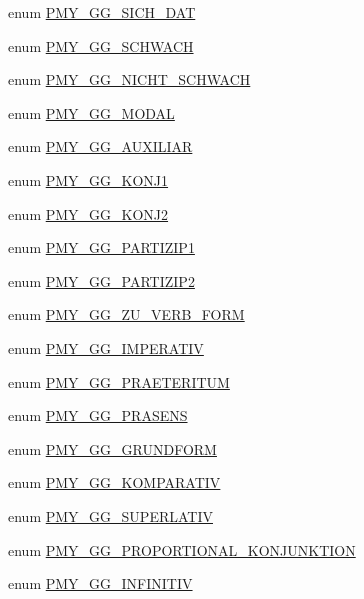 \begin{DoxyCompactItemize}
\item 
enum \hyperlink{gramtab__consts_8php_a30cdcbc198473b63f16f4323928faf96}{PMY\_\-GG\_\-SICH\_\-DAT} 
\item 
enum \hyperlink{gramtab__consts_8php_af23f5a5d0c48da18c4fb7e03a02140ce}{PMY\_\-GG\_\-SCHWACH} 
\item 
enum \hyperlink{gramtab__consts_8php_a934d13cf02654ea66217db78aed651e4}{PMY\_\-GG\_\-NICHT\_\-SCHWACH} 
\item 
enum \hyperlink{gramtab__consts_8php_a4b34a0d19c532c52418137101f6ad347}{PMY\_\-GG\_\-MODAL} 
\item 
enum \hyperlink{gramtab__consts_8php_a1c9092d56a2b707d90e3ac80413e4cad}{PMY\_\-GG\_\-AUXILIAR} 
\item 
enum \hyperlink{gramtab__consts_8php_a28c8cac68840c13079ff84e2d68b3e67}{PMY\_\-GG\_\-KONJ1} 
\item 
enum \hyperlink{gramtab__consts_8php_afeef8954bf0cf2ffa383a2912a8794d9}{PMY\_\-GG\_\-KONJ2} 
\item 
enum \hyperlink{gramtab__consts_8php_a37462ac47895160347be026bb1fd63dd}{PMY\_\-GG\_\-PARTIZIP1} 
\item 
enum \hyperlink{gramtab__consts_8php_a0025450ae6bb543ad52142f0c412a868}{PMY\_\-GG\_\-PARTIZIP2} 
\item 
enum \hyperlink{gramtab__consts_8php_a98a5760176b1e17df19c1d33e267d4b4}{PMY\_\-GG\_\-ZU\_\-VERB\_\-FORM} 
\item 
enum \hyperlink{gramtab__consts_8php_a81f6600fca7c8799fe96dd005d3caa2f}{PMY\_\-GG\_\-IMPERATIV} 
\item 
enum \hyperlink{gramtab__consts_8php_a1d83c0290d4e99a43d040e43282d8a8f}{PMY\_\-GG\_\-PRAETERITUM} 
\item 
enum \hyperlink{gramtab__consts_8php_a1e7dccc3a0dd8d4a501e0ee1b9100cb9}{PMY\_\-GG\_\-PRASENS} 
\item 
enum \hyperlink{gramtab__consts_8php_ae98665b95399250ec449c1916f2f4c53}{PMY\_\-GG\_\-GRUNDFORM} 
\item 
enum \hyperlink{gramtab__consts_8php_a3c0b371bcfce62c3cfcc1ffc125536ab}{PMY\_\-GG\_\-KOMPARATIV} 
\item 
enum \hyperlink{gramtab__consts_8php_a44f0da392ddae9640f0623faff875fdc}{PMY\_\-GG\_\-SUPERLATIV} 
\item 
enum \hyperlink{gramtab__consts_8php_a0a7e2039e8fa61d08a40e12ed8b2a39a}{PMY\_\-GG\_\-PROPORTIONAL\_\-KONJUNKTION} 
\item 
enum \hyperlink{gramtab__consts_8php_ade7b95bd59f614953491a5c771ca1ef3}{PMY\_\-GG\_\-INFINITIV} 

\end{DoxyCompactItemize}
